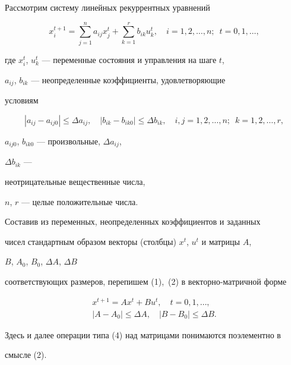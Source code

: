  


Рассмотрим систему линейных рекуррентных уравнений 


\begin{equation} 


x^{t+1}_i=\sum^n_{j=1}a_{ij}x^t_j+\sum^r_{k=1} 


b_{ik}u^t_k,\quad i=1,2,\dotsc,n;\ \; t=0,1,\dotsc, 


\end{equation} 


где $x^t_i$, $u^t_k$ --- переменные состояния и управления на шаге $t$, 


$a_{ij}$, $b_{ik}$ --- неопределенные коэффициенты, удовлетворяющие 


условиям 


\begin{equation} 


|a_{ij}-a_{ij0}|\le\Delta a_{ij},\quad 


|b_{ik}-b_{ik0}|\le\Delta b_{ik}, 


\quad i,j=1,2,\dotsc,n;\ \;k=1,2,\dotsc,r, 


\end{equation} 


$a_{ij0}$, $b_{ik0}$ --- произвольные, $\Delta a_{ij}$, 


$\Delta b_{ik}$ --- 


неотрицательные вещественные числа, 


$n$, $r$ --- целые положительные числа. 


 


Составив из переменных, неопределенных коэффициентов и заданных 


чисел стандартным образом векторы (столбцы) $x^t$, $u^t$ и матрицы $A$, 


$B$, $A_0$, $B_0$, $\Delta A$, $\Delta B$  


соответствующих размеров, перепишем (1),~(2) в векторно-матричной форме 


\begin{gather} 


x^{t+1}=A x^t+B u^t,\quad t=0,1,\dotsc,\\ 


|A-A_0|\le\Delta A,\quad |B-B_0|\le\Delta B. 


\end{gather} 


Здесь и далее операции типа (4) над матрицами понимаются поэлементно в 


смысле (2). 


